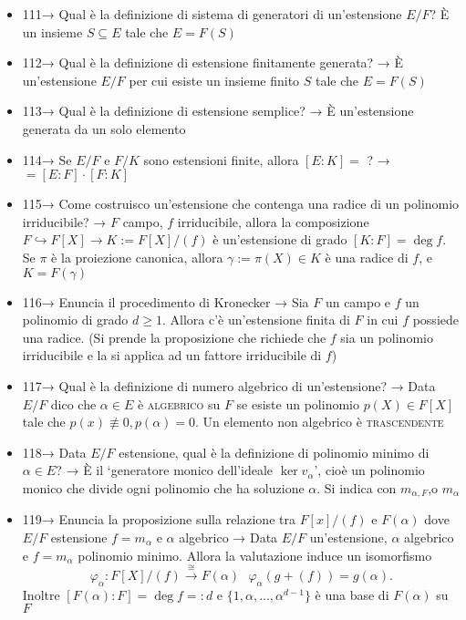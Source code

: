 \documentclass[A4,12pt]{article}
\renewcommand{\subset}{\subseteq}
\begin{document}
\begin{itemize}[noitemsep]
		\item 111→ Qual è la definizione di sistema di generatori di un'estensione $ E/F $? È un insieme $ S\subset E $ tale che $ E = F(S)$
		\item 112→ Qual è la definizione di estensione finitamente generata? → È un'estensione $ E/F $ per cui esiste un insieme finito $ S $ tale che $ E=F(S) $
		\item 113→ Qual è la definizione di estensione semplice? → È un'estensione generata da un solo elemento
		\item 114→ Se $ E/F $ e $ F/K $ sono estensioni finite, allora $ [E:K] =  $ ? → $ = [E:F]\cdot [F:K] $
		\item 115→ Come costruisco un'estensione che contenga una radice di un polinomio irriducibile? → $ F $ campo, $ f $ irriducibile, allora la composizione $ F\hookrightarrow F[X] \to K:=F[X]/(f)$ è un'estensione di grado $ [K:F] = \deg f $. Se $ \pi $ è la proiezione canonica, allora $ \gamma:= \pi(X)\in K $ è una radice di $ f $, e $ K=F(\gamma) $
		\item 116→ Enuncia il procedimento di Kronecker → Sia $ F $ un campo e $ f $ un polinomio di grado $ d\geq 1 $. Allora c'è un'estensione finita di $ F $ in cui $ f $ possiede una radice. (Si prende la proposizione che richiede che $ f $ sia un polinomio irriducibile e la si applica ad un fattore irriducibile di $ f $) 
		\item 117→ Qual è la definizione di numero algebrico di un'estensione? → Data $ E/F $ dico che $ \alpha \in E $ è \textsc{algebrico } su $ F $ se esiste un polinomio $ p(X)\in F[X] $ tale che $ p(x)\not \equiv 0, p(\alpha) = 0 $. Un elemento non algebrico è \textsc{trascendente}
		\item 118→ Data $ E/F $ estensione, qual è la definizione di polinomio minimo di $ \alpha \in E $? → È il \enquote*{generatore monico dell'ideale $ \ker v_\alpha $}, cioè un polinomio monico che divide ogni polinomio che ha soluzione $ \alpha $. Si indica con $ m_{\alpha,F}$,o $m_\alpha  $
		\item 119→ Enuncia la proposizione sulla relazione tra $ F[x]/(f) $ e $ F(\alpha) $ dove $ E/F $ estensione $ f = m_\alpha $ e $ \alpha $ algebrico → Data $ E/F $ un'estensione, $ \alpha $ algebrico e $ f=m_\alpha $ polinomio minimo. Allora la valutazione induce un isomorfismo \[ \varphi_\alpha: F[X]/(f) \overset{\cong}{\longrightarrow} F(\alpha)\ \ \  \varphi_\alpha (g+(f)) =g(\alpha). \] Inoltre $ [F(\alpha):F] = \deg f =:d$ e $ \{1,\alpha,...,\alpha^{d-1}\} $ è una base di $ F(\alpha) $ su $ F $ 

\end{itemize}
\end{document}
